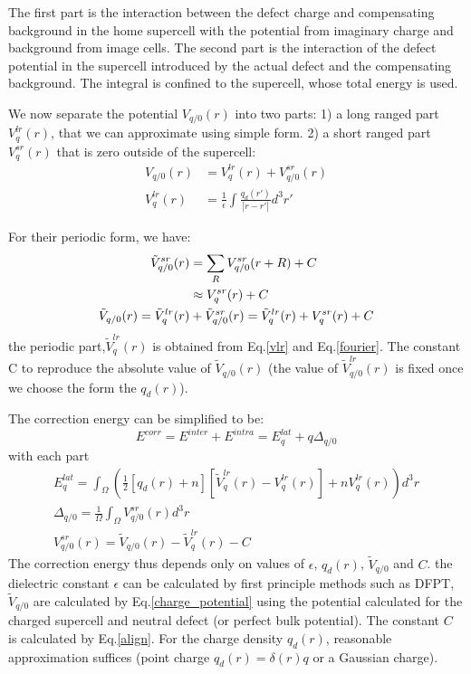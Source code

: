 \documentclass{article}
\begin{document}
The first part is the interaction between the defect charge and compensating background in the home supercell with
the potential from imaginary charge and background from image cells. The second part is the interaction of the 
defect potential in the supercell introduced by the actual defect and the compensating background. The integral is 
confined to the supercell, whose total energy is used.

We now separate the potential $V_{q/0}(r)$ into two parts: 1) a long ranged part $V^{lr}_q(r)$, that we can approximate using 
simple form. 2) a short ranged part $V^{sr}_q(r)$ that is zero outside of the supercell:
\begin{align}
    V_{q/0}(r) &= V^{lr}_{q}(r) + V^{sr}_{q/0}(r) \\
    V^{lr}_{q}(r) &= \frac{1}{\epsilon} \int \frac{q_d(r')}{|r-r'|} d^3 r' \label{vlr}
\end{align} 

For their periodic form, we have:
\begin{align}
    \tilde{V}^{sr}_{q/0}(r) &= \sum_R V^{sr}_{q/0}(r+R) + C \\ \notag 
                &\approx  V^{sr}_q(r) + C \\
    \tilde{V}_{q/0}(r) = \tilde{V}^{lr}_{q}(r) &+ \tilde{V}^{sr}_{q/0}(r) = \tilde{V}^{lr}_{q}(r) + V^{sr}_q(r) + C \label{align}
\end{align}
the periodic part,$\tilde{V}^{lr}_q(r)$ is obtained from Eq.\ref{vlr} and Eq.\ref{fourier}. The constant C to reproduce the 
absolute value of $\tilde{V}_{q/0}(r)$ (the value of $\tilde{V}^{lr}_{q/0}(r)$ is fixed once we choose the form the $q_d(r)$).

The correction energy can be simplified to be:
\begin{equation}
    E^{corr} = E^{inter} + E^{intra} = E^{lat}_q + q\Delta_{q/0}
\end{equation}
with each part
\begin{gather}
    E^{lat}_q = \int_{\Omega} \left( \frac{1}{2} [ q_d(r) + n ][\tilde{V}^{lr}_{q}(r) - V^{lr}_{q}(r) ] +  n V^{lr}_{q}(r) \right) d^3r \\
    \Delta_{q/0} = \frac{1}{\Omega} \int_{\Omega} V^{sr}_{q/0}(r) d^3r  \\
    V^{sr}_{q/0}(r) = \tilde{V}_{q/0}(r) - \tilde{V}^{lr}_{q}(r) - C
\end{gather}
The correction energy thus depends only on values of $\epsilon$, $q_d(r)$, $\tilde{V}_{q/0}$ and $C$.
the dielectric constant $\epsilon$ can be calculated by first principle methods such as DFPT, $\tilde{V}_{q/0}$ 
are calculated by Eq.\ref{charge_potential} using the potential calculated for the charged supercell and 
neutral defect (or perfect bulk potential). The constant $C$ is calculated by Eq.\ref{align}.
For the charge density $q_d(r)$, reasonable approximation suffices (point charge $q_d(r) = \delta(r)q$ or 
a Gaussian charge).
\end{document}

